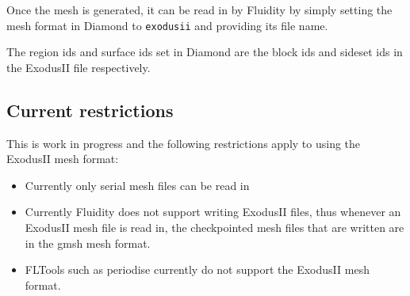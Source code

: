 Once the mesh is generated, it can be read in by Fluidity by simply setting the
mesh format in Diamond to \texttt{exodusii} and providing its file name.

The region ids and surface ids set in Diamond are the block ids and sideset ids
in the ExodusII file respectively.


\subsection*{Current restrictions}
\label{ssec:exodusii_restrictions}

This is work in progress and the following restrictions apply to using the ExodusII
mesh format:
\begin{itemize}
 \item Currently only serial mesh files can be read in
 \item Currently Fluidity does not support writing ExodusII files, thus whenever
 an ExodusII mesh file is read in, the checkpointed mesh files that are written are
 in the gmsh mesh format.
 \item FLTools such as periodise currently do not support the ExodusII mesh format.

\end{itemize}
